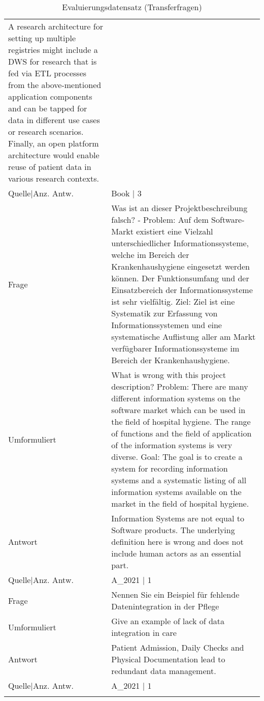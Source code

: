 {\begin{landscape}
\begin{longtable}{p{3cm}p{}}
    A research architecture for setting up multiple registries might include a DWS for research that is fed via ETL processes from the above-mentioned application components and can be tapped for data in different use cases or research scenarios.
    Finally, an open platform architecture would enable reuse of patient data in various research contexts.\\
    Quelle|Anz. Antw. &  Book  | 3 \\
    \midrule
    Frage & Was ist an dieser Projektbeschreibung falsch?
                - Problem: Auf dem Software-Markt existiert eine Vielzahl unterschiedlicher Informationssysteme, welche im Bereich der Krankenhaushygiene eingesetzt werden können.
    Der Funktionsumfang und der Einsatzbereich der Informationssysteme ist sehr vielfältig.
                Ziel: Ziel ist eine Systematik zur Erfassung von Informationssystemen und eine systematische Auflistung aller am Markt verfügbarer Informationssysteme im Bereich der Krankenhaushygiene.\\
    Umformuliert & What is wrong with this project description?
    Problem: There are many different information systems on the software market which can be used in the field of hospital hygiene.
    The range of functions and the field of application of the information systems is very diverse.
    Goal: The goal is to create a system for recording information systems and a systematic listing of all information systems available on the market in the field of hospital hygiene.\\
    Antwort & Information Systems are not equal to Software products.
    The underlying definition here is wrong and does not include human actors as an essential part.\\
    Quelle|Anz. Antw. &  A\_2021  | 1 \\
    \midrule
    Frage & Nennen Sie ein Beispiel für fehlende Datenintegration in der Pflege \\
    Umformuliert & Give an example of lack of data integration in care \\
    Antwort & Patient Admission, Daily Checks and Physical Documentation lead to redundant data management.\\
    Quelle|Anz. Antw. &  A\_2021  | 1 \\
    \bottomrule
    \caption*{Evaluierungsdatensatz (Transferfragen)}\label{tab:evaldata-transfer}
\end{longtable}
\end{landscape}\par}
